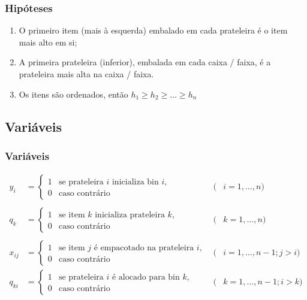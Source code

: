 \documentclass{beamer}
\begin{document}
\begin{frame}
\frametitle {Hipóteses}

    \begin{enumerate}
    \item 
    O primeiro item (mais à esquerda) embalado em cada prateleira é o item mais alto em si;
    \item 
    A primeira prateleira (inferior), embalada em cada caixa / faixa, é a prateleira mais alta na caixa / faixa.
    \item 
    Os itens são ordenados, então $h_1 \geq h_2 \geq \dots \geq h_n $
    \end{enumerate}
\end{frame}

\subsection{Variáveis}
\begin{frame}
\frametitle {Variáveis}

{\small
\nonumber
\begin{align}
    \nonumber
    y_{i} & =
    \begin{cases}
        1 &\text{se prateleira $i$ inicializa bin $i$},\\
        0 &\text{caso contrário }
    \end{cases}  &  (&i = 1, \dots, n) \\
    \\
    q_{k} & =
    \begin{cases}
        1 &\text{se item $k$ inicializa prateleira $k$},\\
        0 &\text{caso contrário }
    \end{cases}  &  (&k = 1, \dots, n) \\
    \\
    x_{ij} &=
    \begin{cases}
        1 &\text{se item $j$ é empacotado na prateleira $i$},\\
        0 &\text{caso contrário }
    \end{cases}  &  (&i = 1, \dots, n-1;  j > i) \\
    q_{ki} &=
    \begin{cases}
        1 &\text{se prateleira $i$ é alocado para bin  $k$},\\
        0 &\text{caso contrário }
    \end{cases} &  (&k = 1, \dots, n-1; i > k) \\
\end{align}
}

\end{frame}
\end{document}
